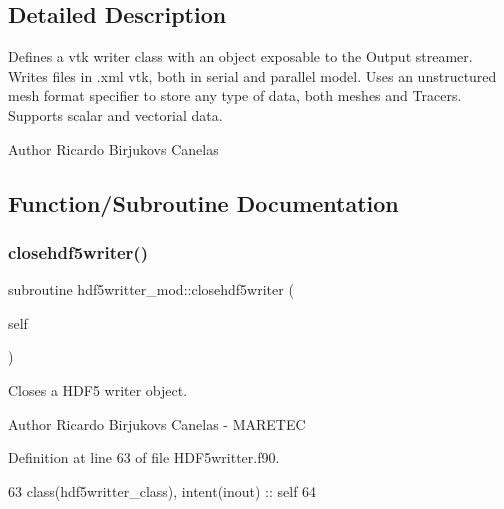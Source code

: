 \subsection{Detailed Description}
Defines a vtk writer class with an object exposable to the Output streamer. Writes files in .xml vtk, both in serial and parallel model. Uses an unstructured mesh format specifier to store any type of data, both meshes and Tracers. Supports scalar and vectorial data. 

\begin{DoxyAuthor}{Author}
Ricardo Birjukovs Canelas 
\end{DoxyAuthor}


\subsection{Function/\+Subroutine Documentation}
\mbox{\label{namespacehdf5writter__mod_a0318c234490ab15f480e7f940266ec4f}} 
\subsubsection{\texorpdfstring{closehdf5writer()}{closehdf5writer()}}
{\footnotesize\ttfamily subroutine hdf5writter\+\_\+mod\+::closehdf5writer (\begin{DoxyParamCaption}\item[{class(\mbox{\hyperlink{structhdf5writter__mod_1_1hdf5writter__class}{hdf5writter\+\_\+class}}), intent(inout)}]{self }\end{DoxyParamCaption})\hspace{0.3cm}{\ttfamily [private]}}



Closes a H\+D\+F5 writer object. 

\begin{DoxyAuthor}{Author}
Ricardo Birjukovs Canelas -\/ M\+A\+R\+E\+T\+EC 
\end{DoxyAuthor}


Definition at line 63 of file H\+D\+F5writter.\+f90.


\begin{DoxyCode}
63     \textcolor{keywordtype}{class}(hdf5writter\_class), \textcolor{keywordtype}{intent(inout)} :: self
64 
\end{DoxyCode}
\mbox{\label{namespacehdf5writter__mod_a2409af91a67db06badcb9ae439142f92}} 

